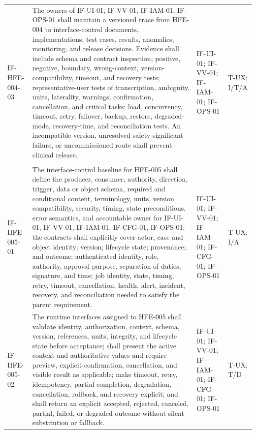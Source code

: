 \documentclass[11pt,letterpaper]{article}
\begin{document}
\begin{scriptsize}
\begin{longtable}{@{}L{0.14\textwidth}L{0.49\textwidth}L{0.19\textwidth}L{0.10\textwidth}@{}}
\addlinespace[2pt]
\mbox{IF-HFE-004-03} & The owners of IF-UI-01, IF-VV-01, IF-IAM-01, IF-OPS-01 shall maintain a versioned trace from HFE-004 to interface-control documents, implementations, test cases, results, anomalies, monitoring, and release decisions. Evidence shall include schema and contract inspection; positive, negative, boundary, wrong-context, version-compatibility, timeout, and recovery tests; representative-user tests of transcription, ambiguity, units, laterality, warnings, confirmation, cancellation, and critical tasks; load, concurrency, timeout, retry, failover, backup, restore, degraded-mode, recovery-time, and reconciliation tests. An incompatible version, unresolved safety-significant failure, or uncommissioned route shall prevent clinical release. & IF-UI-01; IF-VV-01; IF-IAM-01; IF-OPS-01 & T-UX; I\slash\allowbreak{}T\slash\allowbreak{}A \\
\addlinespace[2pt]
 \\
\addlinespace[2pt]
\mbox{IF-HFE-005-01} & The interface-control baseline for HFE-005 shall define the producer, consumer, authority, direction, trigger, data or object schema, required and conditional content, terminology, units, version compatibility, security, timing, state preconditions, error semantics, and accountable owner for IF-UI-01, IF-VV-01, IF-IAM-01, IF-CFG-01, IF-OPS-01; the contracts shall explicitly cover actor, case and object identity; version; lifecycle state; provenance; and outcome; authenticated identity, role, authority, approval purpose, separation of duties, signature, and time; job identity, state, timing, retry, timeout, cancellation, health, alert, incident, recovery, and reconciliation needed to satisfy the parent requirement. & IF-UI-01; IF-VV-01; IF-IAM-01; IF-CFG-01; IF-OPS-01 & T-UX; I\slash\allowbreak{}A \\
\addlinespace[2pt]
\mbox{IF-HFE-005-02} & The runtime interfaces assigned to HFE-005 shall validate identity, authorization, context, schema, version, references, units, integrity, and lifecycle state before acceptance; shall present the active context and authoritative values and require preview, explicit confirmation, cancellation, and visible result as applicable; make timeout, retry, idempotency, partial completion, degradation, cancellation, rollback, and recovery explicit; and shall return an explicit accepted, rejected, canceled, partial, failed, or degraded outcome without silent substitution or fallback. & IF-UI-01; IF-VV-01; IF-IAM-01; IF-CFG-01; IF-OPS-01 & T-UX; T\slash\allowbreak{}D \\

\end{longtable}
\end{scriptsize}
\end{document}
